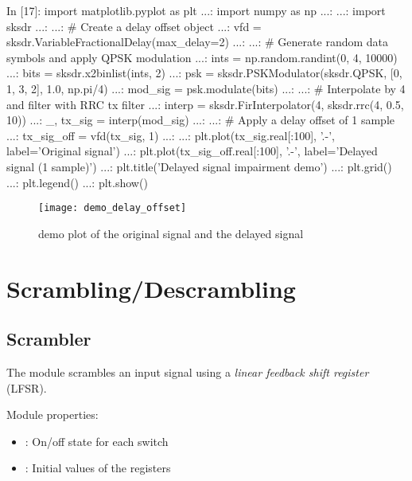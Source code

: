 \begin{python}[label={lst:demo_delay_offset},caption={\code{VariableFractionalDelay} demo}]
  In [17]: import matplotlib.pyplot as plt
    ...: import numpy as np
    ...:
    ...: import sksdr
    ...:
    ...: # Create a delay offset object
    ...: vfd = sksdr.VariableFractionalDelay(max_delay=2)
    ...:
    ...: # Generate random data symbols and apply QPSK modulation
    ...: ints = np.random.randint(0, 4, 10000)
    ...: bits = sksdr.x2binlist(ints, 2)
    ...: psk = sksdr.PSKModulator(sksdr.QPSK, [0, 1, 3, 2], 1.0, np.pi/4)
    ...: mod_sig = psk.modulate(bits)
    ...:
    ...: # Interpolate by 4 and filter with RRC tx filter
    ...: interp = sksdr.FirInterpolator(4, sksdr.rrc(4, 0.5, 10))
    ...: _, tx_sig = interp(mod_sig)
    ...:
    ...: # Apply a delay offset of 1 sample
    ...: tx_sig_off = vfd(tx_sig, 1)
    ...:
    ...: plt.plot(tx_sig.real[:100], '.-', label='Original signal')
    ...: plt.plot(tx_sig_off.real[:100], '.-', label='Delayed signal (1 sample)')
    ...: plt.title('Delayed signal impairment demo')
    ...: plt.grid()
    ...: plt.legend()
    ...: plt.show()
\end{python}

\begin{figure}[H]
  \centering
  \texttt{[image: demo\_delay\_offset]}
  \caption{ demo plot of the original signal and the delayed signal}
  \label{fig:demo_delay_offset}
\end{figure}

\section{Scrambling/Descrambling}

\subsection{Scrambler}

The  module scrambles an input signal using a \emph{linear feedback shift register} (LFSR).

\noindent Module properties:
\begin{itemize}
  \item {}: On/off state for each switch
  \item {}: Initial values of the registers
\end{itemize}

